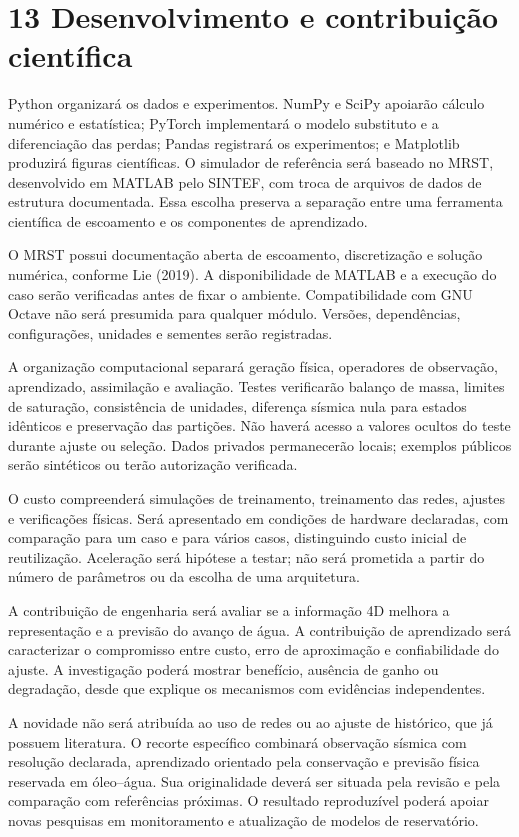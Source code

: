 \documentclass[12pt,a4paper]{article}
\begin{document}
\section*{13 Desenvolvimento e contribuição científica}
Python organizará os dados e experimentos. NumPy e SciPy apoiarão cálculo numérico e estatística; PyTorch implementará o modelo substituto e a diferenciação das perdas; Pandas registrará os experimentos; e Matplotlib produzirá figuras científicas. O simulador de referência será baseado no MRST, desenvolvido em MATLAB pelo SINTEF, com troca de arquivos de dados de estrutura documentada. Essa escolha preserva a separação entre uma ferramenta científica de escoamento e os componentes de aprendizado.\par
O MRST possui documentação aberta de escoamento, discretização e solução numérica, conforme Lie (2019). A disponibilidade de MATLAB e a execução do caso serão verificadas antes de fixar o ambiente. Compatibilidade com GNU Octave não será presumida para qualquer módulo. Versões, dependências, configurações, unidades e sementes serão registradas.\par
A organização computacional separará geração física, operadores de observação, aprendizado, assimilação e avaliação. Testes verificarão balanço de massa, limites de saturação, consistência de unidades, diferença sísmica nula para estados idênticos e preservação das partições. Não haverá acesso a valores ocultos do teste durante ajuste ou seleção. Dados privados permanecerão locais; exemplos públicos serão sintéticos ou terão autorização verificada.\par
O custo compreenderá simulações de treinamento, treinamento das redes, ajustes e verificações físicas. Será apresentado em condições de hardware declaradas, com comparação para um caso e para vários casos, distinguindo custo inicial de reutilização. Aceleração será hipótese a testar; não será prometida a partir do número de parâmetros ou da escolha de uma arquitetura.\par
A contribuição de engenharia será avaliar se a informação 4D melhora a representação e a previsão do avanço de água. A contribuição de aprendizado será caracterizar o compromisso entre custo, erro de aproximação e confiabilidade do ajuste. A investigação poderá mostrar benefício, ausência de ganho ou degradação, desde que explique os mecanismos com evidências independentes.\par
A novidade não será atribuída ao uso de redes ou ao ajuste de histórico, que já possuem literatura. O recorte específico combinará observação sísmica com resolução declarada, aprendizado orientado pela conservação e previsão física reservada em óleo--água. Sua originalidade deverá ser situada pela revisão e pela comparação com referências próximas. O resultado reproduzível poderá apoiar novas pesquisas em monitoramento e atualização de modelos de reservatório.\par
\end{document}
